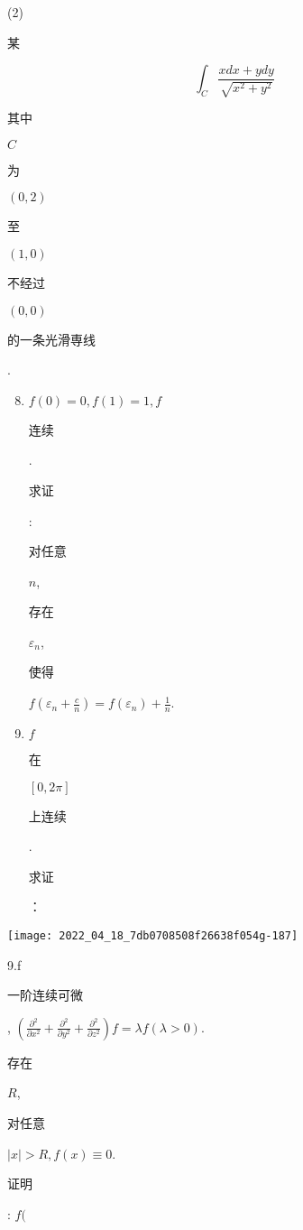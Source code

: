 \documentclass[10pt]{article}
\begin{document}
(2) \begin{CJK}{UTF8}{mj}某\end{CJK}
$$
\int_{C} \frac{x d x+y d y}{\sqrt{x^{2}+y^{2}}}
$$
\begin{CJK}{UTF8}{mj}其中\end{CJK} $C$ \begin{CJK}{UTF8}{mj}为\end{CJK} $(0,2)$ \begin{CJK}{UTF8}{mj}至\end{CJK} $(1,0)$ \begin{CJK}{UTF8}{mj}不经过\end{CJK} $(0,0)$ \begin{CJK}{UTF8}{mj}的一条光滑専线\end{CJK}.

\begin{enumerate}
  \setcounter{enumi}{7}
  \item $f(0)=0, f(1)=1, f$ \begin{CJK}{UTF8}{mj}连续\end{CJK}. \begin{CJK}{UTF8}{mj}求证\end{CJK}: \begin{CJK}{UTF8}{mj}对任意\end{CJK} $n$, \begin{CJK}{UTF8}{mj}存在\end{CJK} $\varepsilon_{n}$, \begin{CJK}{UTF8}{mj}使得\end{CJK} $f\left(\varepsilon_{n}+\frac{c}{n}\right)=f\left(\varepsilon_{n}\right)+\frac{1}{n}$.

  \item $f$ \begin{CJK}{UTF8}{mj}在\end{CJK} $[0,2 \pi]$ \begin{CJK}{UTF8}{mj}上连续\end{CJK}.\begin{CJK}{UTF8}{mj}求证\end{CJK}：

\end{enumerate}
\texttt{[image: 2022\_04\_18\_7db0708508f26638f054g-187]}

9.f \begin{CJK}{UTF8}{mj}一阶连续可微\end{CJK}, $\left(\frac{\partial^{2}}{\partial x^{2}}+\frac{\partial^{2}}{\partial y^{2}}+\frac{\partial^{2}}{\partial z^{2}}\right) f=\lambda f(\lambda>0)$. \begin{CJK}{UTF8}{mj}存在\end{CJK} $R$, \begin{CJK}{UTF8}{mj}对任意\end{CJK} $|x|>R, f(x) \equiv 0$. \begin{CJK}{UTF8}{mj}证明\end{CJK}: $f($
\end{document}
